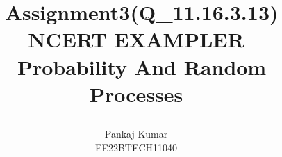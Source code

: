 \documentclass[journal,12pt,twocolumn]{IEEEtran}
\theoremstyle{remark}
\begin{document}
%




\vspace{3cm}

\title{
\Huge \ Assignment3(Q_11.16.3.13)\\ NCERT EXAMPLER\\
\Huge\ Probability And Random Processes\\
\large\author{Pankaj Kumar \\EE22BTECH11040}
}





\maketitle

\newpage


\bigskip

\renewcommand{\thefigure}{\theenumi}
\renewcommand{\thetable}{\theenumi}

%




%
\end{document}
